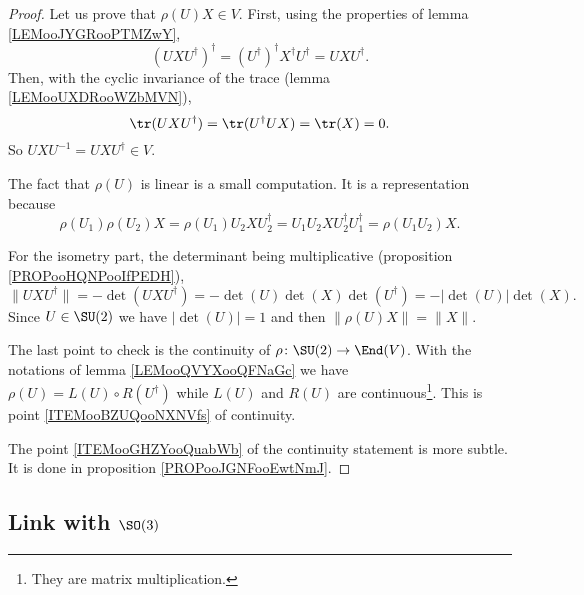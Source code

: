 \begin{proof}
	Let us prove that \( \rho(U)X\in V\). First, using the properties of lemma \ref{LEMooJYGRooPTMZwY},
	\begin{equation}
		(UXU^{\dag})^{\dag}=(U^{\dag})^{\dag}X^{\dag}U^{\dag}=UXU^{\dag}.
	\end{equation}
	Then, with the cyclic invariance of the trace (lemma \ref{LEMooUXDRooWZbMVN}),
	\begin{equation}
		\tr(UXU^{\dag})=\tr(U^{\dag}UX)=\tr(X)=0.
	\end{equation}
	So \( UXU^{-1}=UXU^{\dag}\in V\).

	The fact that \( \rho(U)\) is linear is a small computation. It is a representation because
	\begin{equation}
		\rho(U_1)\rho(U_2)X=\rho(U_1)U_2XU_2^{\dag}=U_1U_2XU_2^{\dag}U_1^{\dag}=\rho(U_1U_2)X.
	\end{equation}

	For the isometry part, the determinant being multiplicative (proposition \ref{PROPooHQNPooIfPEDH}),
	\begin{equation}
		\| UXU^{\dag} \|=-\det(UXU^{\dag})=-\det(U)\det(X)\det(U^{\dag})=-| \det(U) |\det(X).
	\end{equation}
	Since \( U\in\SU(2)\) we have \( | \det(U) |=1\) and then \( \| \rho(U)X \|=\| X \|\).

	The last point to check is the continuity of \( \rho\colon \SU(2)\to \End(V)\). With the notations of lemma \ref{LEMooQVYXooQFNaGc} we have \( \rho(U)=L(U)\circ R(U^{\dag})\) while \( L(U)\) and \( R(U)\) are continuous\footnote{They are matrix multiplication.}. This is point \ref{ITEMooBZUQooNXNVfs} of continuity.

	The point \ref{ITEMooGHZYooQuabWb} of the continuity statement is more subtle. It is done in proposition \ref{PROPooJGNFooEwtNmJ}.
\end{proof}

\subsection{Link with \texorpdfstring{$ \SO(3)$}{SO(3)}}

